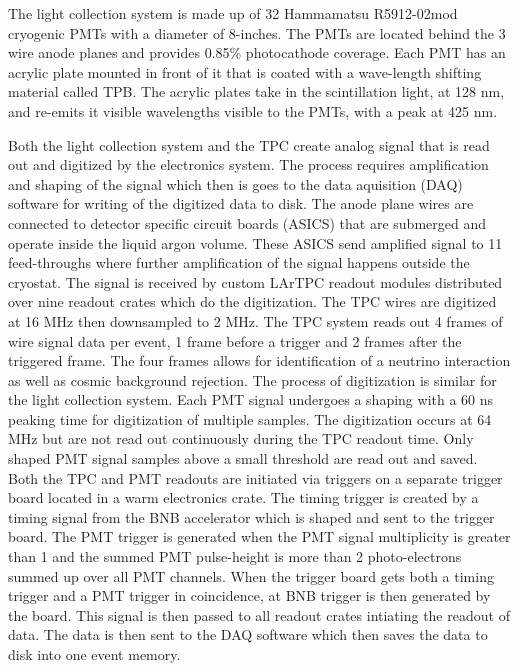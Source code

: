 The light collection system is made up of 32 Hammamatsu R5912-02mod cryogenic PMTs with a diameter of 8-inches. The PMTs are located behind the 3 wire anode planes and provides 0.85\% photocathode coverage. Each PMT has an acrylic plate mounted in front of it that is coated with a wave-length shifting material called TPB. The acrylic plates take in the scintillation light, at 128 nm, and re-emits it visible wavelengths visible to the PMTs, with a peak at 425 nm. 

Both the light collection system and the TPC create analog signal that is read out and digitized by the electronics system. The process requires amplification and shaping of the signal which then is goes to the data aquisition (DAQ) software for writing of the digitized data to disk. The anode plane wires are connected to detector specific circuit boards (ASICS) that are submerged and operate inside the liquid argon volume. These ASICS send amplified signal to 11 feed-throughs where further amplification of the signal happens outside the cryostat. The signal is received by custom LArTPC readout modules distributed over nine readout crates which do the digitization. The TPC wires are digitized at 16 MHz then downsampled to 2 MHz. The TPC system reads out 4 frames of wire signal data per event, 1 frame before a trigger and 2 frames after the triggered frame. The four frames allows for identification of a neutrino interaction as well as cosmic background rejection. The process of digitization is similar for the light collection system. Each PMT signal undergoes a shaping with a 60 ns  peaking time for digitization of multiple samples. The digitization occurs at 64 MHz but are not read out continuously during the TPC readout time. Only shaped PMT signal samples above a small threshold are read out and saved. Both the TPC and PMT readouts are initiated via triggers on a separate trigger board located in a warm electronics crate. The timing trigger is created by a timing signal from the BNB accelerator which is shaped and sent to the trigger board. The PMT trigger is generated when the PMT signal multiplicity is greater than 1 and the summed PMT pulse-height is more than 2 photo-electrons summed up over all PMT channels. When the trigger board gets both a timing trigger and a PMT trigger in coincidence, at BNB trigger is then generated by the board. This signal is then passed to all readout crates intiating the readout of data. The data is then sent to the DAQ software which then saves the data to disk into one event memory.

